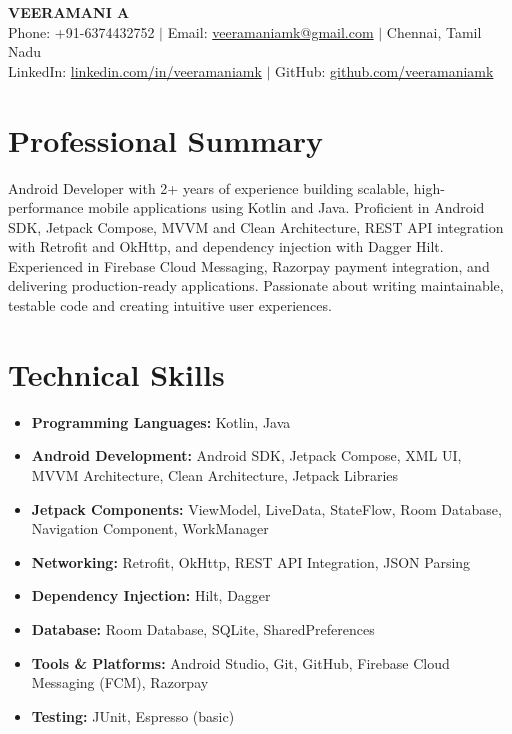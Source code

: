 \documentclass[letterpaper,11pt]{article}
\begin{document}

\begin{center}
  {\Huge \textbf{VEERAMANI A}} \\ \vspace{6pt}
  \small
  Phone: +91-6374432752 \quad $|$ \quad
  Email: \href{mailto:veeramaniamk@gmail.com}{veeramaniamk@gmail.com} \quad $|$ \quad
  Chennai, Tamil Nadu \\ \vspace{3pt}
  LinkedIn: \href{https://linkedin.com/in/veeramaniamk}{linkedin.com/in/veeramaniamk} \quad $|$ \quad
  GitHub: \href{https://github.com/veeramaniamk}{github.com/veeramaniamk}
\end{center}


\section{Professional Summary}

Android Developer with 2+ years of experience building scalable, high-performance mobile applications using Kotlin and Java. Proficient in Android SDK, Jetpack Compose, MVVM and Clean Architecture, REST API integration with Retrofit and OkHttp, and dependency injection with Dagger Hilt. Experienced in Firebase Cloud Messaging, Razorpay payment integration, and delivering production-ready applications. Passionate about writing maintainable, testable code and creating intuitive user experiences.


\section{Technical Skills}

\begin{itemize}[leftmargin=0in, label={}, itemsep=2pt]
  \item \textbf{Programming Languages:} Kotlin, Java
  \item \textbf{Android Development:} Android SDK, Jetpack Compose, XML UI, MVVM Architecture, Clean Architecture, Jetpack Libraries
  \item \textbf{Jetpack Components:} ViewModel, LiveData, StateFlow, Room Database, Navigation Component, WorkManager
  \item \textbf{Networking:} Retrofit, OkHttp, REST API Integration, JSON Parsing
  \item \textbf{Dependency Injection:} Hilt, Dagger
  \item \textbf{Database:} Room Database, SQLite, SharedPreferences
  \item \textbf{Tools \& Platforms:} Android Studio, Git, GitHub, Firebase Cloud Messaging (FCM), Razorpay
  \item \textbf{Testing:} JUnit, Espresso (basic)
\end{itemize}
\end{document}
